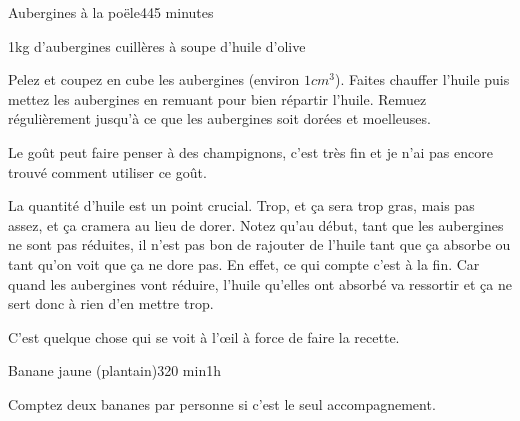 {\renewcommand{\section}[1]{}

\section{Aubergines à la poële}
\begin{recette}{Aubergines à la poële}{4}{45 minutes}{}
\begin{ingredients}
\ingredient 1kg d'aubergines
 cuillères à soupe d'huile d'olive
\end{ingredients}

\begin{preparation}
\etape Pelez et coupez en cube les aubergines (environ $1\unit{cm}^3$).
\etape Faites chauffer l'huile puis mettez les aubergines en remuant pour bien répartir l'huile. 
\etape Remuez régulièrement jusqu'à ce que les aubergines soit dorées et moelleuses.
\end{preparation}

Le goût peut faire penser à des champignons, c'est très fin et je n'ai pas encore trouvé comment utiliser ce goût.

\begin{remarque}
La quantité d'huile est un point crucial. Trop, et ça sera trop gras, mais pas assez, et ça cramera au lieu de dorer. Notez 
qu'au début, tant que les aubergines ne sont pas réduites, il n'est pas bon de rajouter de l'huile tant que ça absorbe ou tant 
qu'on voit que ça ne dore pas. En effet, ce qui compte c'est à la fin. Car quand les aubergines vont réduire, l'huile qu'elles 
ont absorbé va ressortir et ça ne sert donc à rien d'en mettre trop. 

C'est quelque chose qui se voit à l'œil à force de faire la recette.
\end{remarque}
\end{recette}

\section{Banane jaune (plantain)}
\begin{recette}{Banane jaune (plantain)}{3}{20 min}{1h}
\begin{ingredients}
\ingredient Comptez deux bananes par personne si c'est le seul accompagnement.
\end{ingredients}


\end{recette}}
